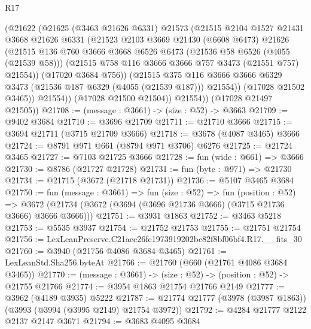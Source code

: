\begin{lexlean}{R17}
\begin{coremodule}
              (@21622
                (@21625
                  (@3463 @21626 @6331)
                  @21573
                  (@21515
                    @2104
                    @1527
                    @21431
                    @3668
                    @21626
                    @6331
                    (@21523
                      @2103
                      @3669
                      @21430
                      (@6608 @6473)
                      @21626
                      (@21515
                        @136
                        @760
                        @3666
                        @3668
                        @6526
                        @6473
                        (@21536 @58 @6526 (@4055 (@21539 @58)))
                        (@21515 @758 @116 @3666 @3666 @757 @3473 (@21551 @757) @21554))
                      (@17020 @3684 @756))
                    (@21515
                      @375
                      @116
                      @3666
                      @3666
                      @6329
                      @3473
                      (@21536 @187 @6329 (@4055 (@21539 @187)))
                      @21554))
                  (@17028 @21502 @3465))
                @21554))
            (@17028 @21500 @21504))
          @21554))
      (@17028 @21497 @21505))
@21708 := (message : @3661) -> (size : @52) -> @3663
@21709 := @9402 @3684
@21710 := @3696 @21709
@21711 := @21710 @3666
@21715 := @3694 @21711 (@3715 @21709 @3666)
@21718 := @3678 (@4087 @3465) @3666
@21724 := @8791 @971 @661 (@8794 @971 @3706) @6276
@21725 := @21724 @3465
@21727 := @7103 @21725 @3666
@21728 := fun (wide : @661) => @3666
@21730 := @8786 (@21727 @21728)
@21731 := fun (byte : @971) => @21730
@21734 := @21715 (@3672 (@21718 @21731))
@21736 := @5107 @3465 @3684
@21750 := fun (message : @3661) =>
  fun (size : @52) =>
  fun (position : @52) =>
  @3672 (@21734 (@3672 (@3694 (@3696 @21736 @3666) (@3715 @21736 @3666) @3666 @3666)))
@21751 := @3931 @1863
@21752 := @3463 @5218
@21753 := @5535 @3937
@21754 := @21752 @21753
@21755 := @21751 @21754
@21756 := LexLeanPreserve.C21aec26fe1973919202bc82f8bf06bf4.R17.__fits_30
@21760 := @3940 (@21756 @4086 @3684 @3465)
@21761 := LexLeanStd.Sha256.byteAt
@21766 := @21760 (@660 (@21761 @4086 @3684 @3465))
@21770 := (message : @3661) -> (size : @52) -> (position : @52) -> @21755 @21766
@21774 := @3954 @1863 @21754 @21766 @2149
@21777 := @3962 (@4189 @3935) @5222
@21787 := @21774 @21777 (@3978 (@3987 @1863)) (@3993 (@3994 (@3995 @2149) @21754 @3972))
@21792 := @4284 @21777 @2122 @2137 @2147 @3671
@21794 := @3683 @4095 @3684

\end{coremodule}
\end{lexlean}
